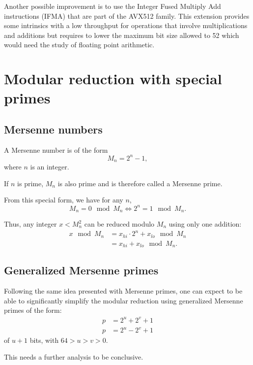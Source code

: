 \documentclass[a4paper]{article}
\begin{document}
\bigskip
Another possible improvement is to use the Integer Fused Multiply Add instructions (IFMA) that are part of
the AVX512 family. This extension provides some intrinsics with a low throughput for operations that involve
multiplications and additions but requires to lower the maximum bit size allowed to 52 which would need the
study of floating point arithmetic.


\newpage
 
 
\nocite{*}


\newpage
\appendix
\section{Modular reduction with special primes} \label{app}

\subsection{Mersenne numbers}

\begin{definition}
    A Mersenne number is of the form $$ M_n = 2^n-1,$$ where $n$ is an integer.

    If $n$ is prime, $M_n$ is also prime and is therefore called a Mersenne prime.
\end{definition}

From this special form, we have for any $n$,
\[
M_n = 0 \mod M_n \Longleftrightarrow 2^n = 1 \mod M_n.
\]

Thus, any integer $x < M_n^2$ can be reduced modulo $M_n$ using only one addition: 
\begin{align*}
x \mod M_n &= x_{hi}\cdot 2^{n} + x_{lo} \mod M_n \\
    &= x_{hi} + x_{lo} \mod M_n.
\end{align*}


\subsection{Generalized Mersenne primes}

Following the same idea presented with Mersenne primes, one can expect to be able to significantly simplify
the modular reduction using generalized Mersenne primes of the form:
\begin{align*}
    p &= 2^u + 2^v + 1 \\ 
    p &= 2^u - 2^v + 1 
\end{align*}
of $u+1$ bits, with $64 > u > v > 0$.

This needs a further analysis to be conclusive.
\end{document}
